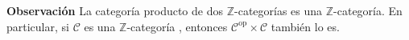 \documentclass[preview]{standalone}
\begin{document}
\begin{center}
\flushleft \textbf{Observación} La categoría producto de dos $\mathbb{Z}$-categorías es una $\mathbb{Z}$-categoría. En particular, si $\mathscr{C}$ es una $\mathbb{Z}$-categoría , entonces $\mathscr{C}^\text{op}\times\mathscr{C}$ también lo es.
\end{center}
\end{document}
